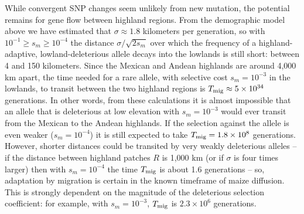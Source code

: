 {{While convergent SNP changes seem unlikely from new mutation, the potential remains for gene flow between highland regions.
From the demographic model above we have estimated that $\sigma \approx 1.8$ kilometers per generation, so with $10^{-1} \ge s_m \ge 10^{-4}$ the distance $\sigma/\sqrt{2s_m}$ over which the frequency of a highland-adaptive, lowland-deleterious allele decays into the lowlands is still short: between 4 and 150 kilometers.
Since the Mexican and Andean highlands are around 4,000 km apart, the time needed for a rare allele, with selective cost $s_m=10^{-3}$ in the lowlands, to transit between the two highland regions is $T_{\text{mig}} \approx 5 \times 10^{34}$ generations.
In other words, from these calculations it is almost impossible that an allele that is deleterious at low elevation with $s_m=10^{-3}$ would ever transit from the Mexican to the Andean highlands.
If the selection against the allele is even weaker ($s_m=10^{-4}$) it is still expected to take $T_{\text{mig}} = 1.8 \times 10^8$ generations.
However, shorter distances could be transited by very weakly deleterious alleles -- if the distance between highland patches $R$ is 1,000 km (or if $\sigma$ is four times larger) then with $s_m=10^{-4}$ the time $T_{\text{mig}}$ is about 1.6 generations -- so, adaptation by migration is certain in the known timeframe of maize diffusion.
This is strongly dependent on the magnitude of the deleterious selection coefficient: for example, with $s_m=10^{-3}$, $T_{\text{mig}}$ is $2.3 \times 10^6$ generations.

}}
